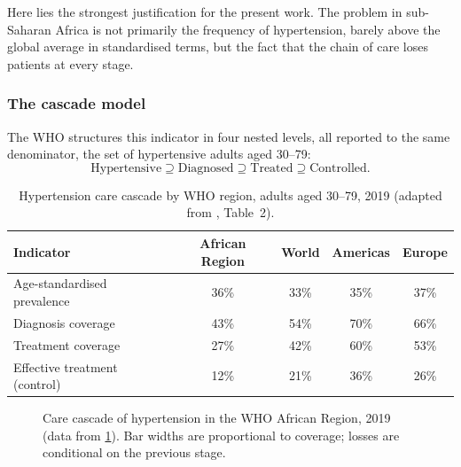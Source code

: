\documentclass[12pt,a4paper,oneside]{report}
\begin{document}
Here lies the strongest justification for the present work. The problem in sub-Saharan Africa is not primarily the frequency of hypertension, barely above the global average in standardised terms, but the fact that the chain of care loses patients at every stage.

\subsubsection{The cascade model}

The WHO structures this indicator in four nested levels, all reported to the same denominator, the set of hypertensive adults aged 30--79:
\begin{equation}
  \text{Hypertensive} \supseteq \text{Diagnosed} \supseteq \text{Treated} \supseteq \text{Controlled}.
\end{equation}

\begin{table}[htbp]
\centering\small
\caption{Hypertension care cascade by WHO region, adults aged 30--79, 2019 (adapted from \cite{who2023hypertension}, Table~2).}\label{tab:cascade}
\begin{tabularx}{\textwidth}{@{}X c c c c@{}}
\toprule
\textbf{Indicator} & \textbf{African Region} & \textbf{World} & \textbf{Americas} & \textbf{Europe} \\
\midrule
Age-standardised prevalence & 36\% & 33\% & 35\% & 37\% \\
Diagnosis coverage & 43\% & 54\% & 70\% & 66\% \\
Treatment coverage & 27\% & 42\% & 60\% & 53\% \\
Effective treatment (control) & 12\% & 21\% & 36\% & 26\% \\
\bottomrule
\end{tabularx}
\end{table}

\begin{figure}[htbp]
\centering
{}
\caption{Care cascade of hypertension in the WHO African Region, 2019 (data from \cref{tab:cascade}). Bar widths are proportional to coverage; losses are conditional on the previous stage.}\label{fig:funnel}
\end{figure}
\end{document}
